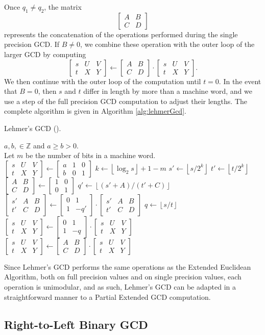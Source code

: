 \documentclass{ucalgthes1}
\theoremstyle{definition}
\newcommand{\ZZ}{\mathbb{Z}}
\newcommand{\matrixtt}[4]{\left[ \begin{array}{rr} #1 & #2 \\ #3 & #4 \end{array} \right]}
\newcommand{\matrixThreeTwo}[6]{\left[ \begin{array}{rrr} #1 & #2 & #3 \\ #4 & #5 & #6 \end{array} \right]}
\newcommand{\floor}[1]{\left\lfloor #1 \right\rfloor}
\begin{document}
Once $q_1 \neq q_2$, the matrix
\[
\matrixtt{A}{B}{C}{D}
\]
represents the concatenation of the operations performed during the single precision GCD.  If $B \neq 0$, we combine these operation with the outer loop of the larger GCD by computing
\[
\matrixThreeTwo{s}{U}{V}{t}{X}{Y} \gets \matrixtt{A}{B}{C}{D}
		        \cdot \matrixThreeTwo{s}{U}{V}{t}{X}{Y}.
\]
We then continue with the outer loop of the computation until $t = 0$.  In the event that $B=0$, then $s$ and $t$ differ in length by more than a machine word, and we use a step of the full precision GCD computation to adjust their lengths.  The complete algorithm is given in Algorithm \ref{alg:lehmerGcd}.

\begin{algorithm}[h]
\caption{Lehmer's GCD (\cite{Lehmer1938}).}
\label{alg:lehmerGcd}
\begin{algorithmic}[1]
\REQUIRE $a,b, \in \ZZ$ and $a \ge b > 0$. \\
         Let $m$ be the number of bits in a machine word. \\
\STATE $\matrixThreeTwo{s}{U}{V}{t}{X}{Y} \gets \matrixThreeTwo{a}{1}{0}{b}{0}{1}$
	\STATE $k \gets \floor{\log_2 s} + 1 - m$
	\STATE $s' \gets \floor{s / 2^k}$ 
	\STATE $t' \gets \floor{t / 2^k}$
	\STATE $\matrixtt{A}{B}{C}{D} \gets \matrixtt{1}{0}{0}{1}$
	\WHILE{$t' \neq 0$ and $\floor{(s'+A)/(t'+C)} = \floor{(s'+B)/(t'+D)}$}
		\STATE $q' \gets \floor{(s'+A)/(t'+C)}$ 
		\STATE $\matrixThreeTwo{s'}{A}{B}{t'}{C}{D} \gets \matrixtt{0}{1}{1}{-q'}
			    \cdot \matrixThreeTwo{s'}{A}{B}{t'}{C}{D}$
	\ENDWHILE
		\STATE $q \gets \floor{s/t}$  
		\STATE $\matrixThreeTwo{s}{U}{V}{t}{X}{Y} \gets \matrixtt{0}{1}{1}{-q}
		        \cdot \matrixThreeTwo{s}{U}{V}{t}{X}{Y}$
	\ELSE
		\STATE $\matrixThreeTwo{s}{U}{V}{t}{X}{Y} \gets \matrixtt{A}{B}{C}{D}
		        \cdot \matrixThreeTwo{s}{U}{V}{t}{X}{Y}$ 
	\ENDIF
\ENDWHILE
\end{algorithmic}
\end{algorithm}

Since Lehmer's GCD performs the same operations as the Extended Euclidean Algorithm, both on full precision values and on single precision values, each operation is unimodular, and as such, Lehmer's GCD can be adapted in a straightforward manner to a Partial Extended GCD computation.

\subsection{Right-to-Left Binary GCD}
\label{subsec:r2lBinGcd}
\end{document}
